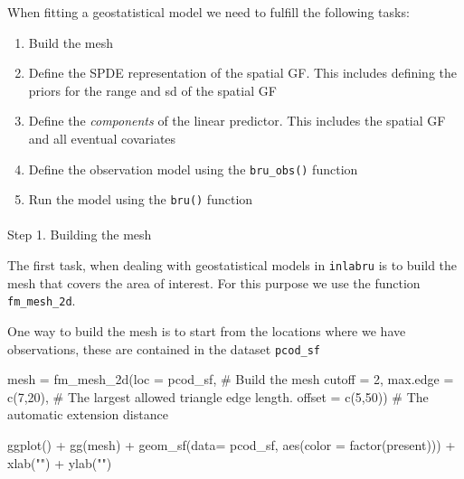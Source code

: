 \documentclass[
  letterpaper,
  DIV=11,
  numbers=noendperiod]{scrartcl}
\makeatletter
\let\oldparagraph\paragraph
\renewcommand{\paragraph}{
    \@ifstar
      \xxxParagraphStar
      \xxxParagraphNoStar
  }
\newcommand{\xxxParagraphStar}[1]{\oldparagraph*{#1}\mbox{}}
\newcommand{\xxxParagraphNoStar}[1]{\oldparagraph{#1}\mbox{}}
\newenvironment{Shaded}{\begin{snugshade}}{\end{snugshade}}
\newcommand{\AttributeTok}[1]{\textcolor[rgb]{0.40,0.45,0.13}{#1}}
\newcommand{\CommentTok}[1]{\textcolor[rgb]{0.37,0.37,0.37}{#1}}
\newcommand{\DecValTok}[1]{\textcolor[rgb]{0.68,0.00,0.00}{#1}}
\newcommand{\FunctionTok}[1]{\textcolor[rgb]{0.28,0.35,0.67}{#1}}
\newcommand{\NormalTok}[1]{\textcolor[rgb]{0.00,0.23,0.31}{#1}}
\newcommand{\OtherTok}[1]{\textcolor[rgb]{0.00,0.23,0.31}{#1}}
\newcommand{\SpecialCharTok}[1]{\textcolor[rgb]{0.37,0.37,0.37}{#1}}
\newcommand{\StringTok}[1]{\textcolor[rgb]{0.13,0.47,0.30}{#1}}
\providecommand{\tightlist}{%
  \setlength{\itemsep}{0pt}\setlength{\parskip}{0pt}}\usepackage{longtable,booktabs,array}
\makeatother
\begin{document}
When fitting a geostatistical model we need to fulfill the following
tasks:

\begin{enumerate}
\def\labelenumi{\arabic{enumi}.}
\tightlist
\item
  Build the mesh
\item
  Define the SPDE representation of the spatial GF. This includes
  defining the priors for the range and sd of the spatial GF
\item
  Define the \emph{components} of the linear predictor. This includes
  the spatial GF and all eventual covariates
\item
  Define the observation model using the \texttt{bru\_obs()} function
\item
  Run the model using the \texttt{bru()} function
\end{enumerate}

\paragraph{Step 1. Building the mesh}\label{step-1.-building-the-mesh}

The first task, when dealing with geostatistical models in
\texttt{inlabru} is to build the mesh that covers the area of interest.
For this purpose we use the function \texttt{fm\_mesh\_2d}.

One way to build the mesh is to start from the locations where we have
observations, these are contained in the dataset \texttt{pcod\_sf}

\begin{Shaded}
\begin{Highlighting}[]
\NormalTok{mesh }\OtherTok{=} \FunctionTok{fm\_mesh\_2d}\NormalTok{(}\AttributeTok{loc =}\NormalTok{ pcod\_sf,           }\CommentTok{\# Build the mesh}
                  \AttributeTok{cutoff =} \DecValTok{2}\NormalTok{,}
                  \AttributeTok{max.edge =} \FunctionTok{c}\NormalTok{(}\DecValTok{7}\NormalTok{,}\DecValTok{20}\NormalTok{),     }\CommentTok{\# The largest allowed triangle edge length.}
                  \AttributeTok{offset =} \FunctionTok{c}\NormalTok{(}\DecValTok{5}\NormalTok{,}\DecValTok{50}\NormalTok{))       }\CommentTok{\# The automatic extension distance}

\FunctionTok{ggplot}\NormalTok{() }\SpecialCharTok{+} \FunctionTok{gg}\NormalTok{(mesh) }\SpecialCharTok{+}
  \FunctionTok{geom\_sf}\NormalTok{(}\AttributeTok{data=}\NormalTok{ pcod\_sf, }\FunctionTok{aes}\NormalTok{(}\AttributeTok{color =} \FunctionTok{factor}\NormalTok{(present))) }\SpecialCharTok{+} 
  \FunctionTok{xlab}\NormalTok{(}\StringTok{""}\NormalTok{) }\SpecialCharTok{+} \FunctionTok{ylab}\NormalTok{(}\StringTok{""}\NormalTok{)}
\end{Highlighting}
\end{Shaded}
\end{document}
